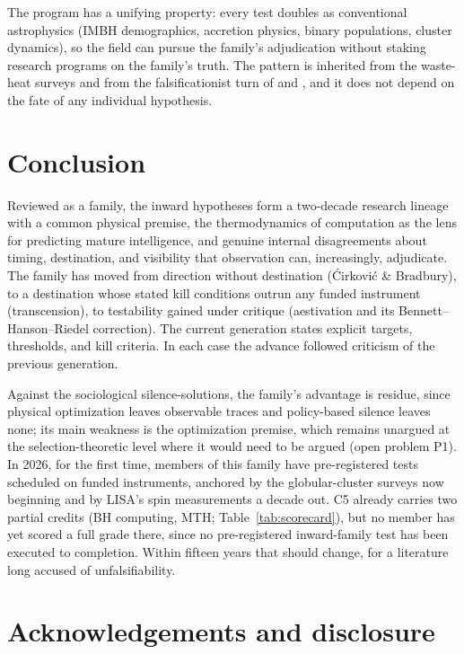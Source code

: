 \documentclass[11pt]{article}
\begin{document}
The program has a unifying property: every test doubles as conventional astrophysics (IMBH demographics, accretion physics, binary populations, cluster dynamics), so the field can pursue the family's adjudication without staking research programs on the family's truth. The pattern is inherited from the waste-heat surveys \citep{Wright2014,Griffith2015} and from the falsificationist turn of \citet{Sandberg2016} and \citet{Dvali2023}, and it does not depend on the fate of any individual hypothesis.

\section{Conclusion}
\label{sec:conclusion}

Reviewed as a family, the inward hypotheses form a two-decade research lineage with a common physical premise, the thermodynamics of computation as the lens for predicting mature intelligence, and genuine internal disagreements about timing, destination, and visibility that observation can, increasingly, adjudicate. The family has moved from direction without destination (\'Cirkovi\'c \& Bradbury), to a destination whose stated kill conditions outrun any funded instrument (transcension), to testability gained under critique (aestivation and its Bennett--Hanson--Riedel correction). The current generation states explicit targets, thresholds, and kill criteria. In each case the advance followed criticism of the previous generation.

Against the sociological silence-solutions, the family's advantage is residue, since physical optimization leaves observable traces and policy-based silence leaves none; its main weakness is the optimization premise, which remains unargued at the selection-theoretic level where it would need to be argued (open problem P1). In 2026, for the first time, members of this family have pre-registered tests scheduled on funded instruments, anchored by the globular-cluster surveys now beginning and by LISA's spin measurements a decade out. C5 already carries two partial credits (BH computing, MTH; Table~\ref{tab:scorecard}), but no member has yet scored a full grade there, since no pre-registered inward-family test has been executed to completion. Within fifteen years that should change, for a literature long accused of unfalsifiability.

\section*{Acknowledgements and disclosure}
\end{document}
